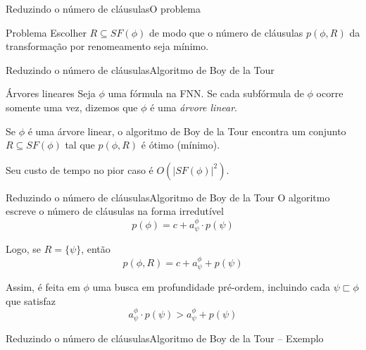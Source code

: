 \begin{frame}{Reduzindo o número de cláusulas}{O problema}
	\begin{block}{Problema}
		Escolher $R \subseteq SF(\phi)$ de modo que o número de cláusulas $p(\phi,R)$ da transformação por renomeamento seja mínimo.
	\end{block}
\end{frame}

\begin{frame}{Reduzindo o número de cláusulas}{Algoritmo de Boy de la Tour}
	\begin{block}{Árvores lineares}
		Seja $\phi$ uma fórmula na FNN. Se cada subfórmula de $\phi$ ocorre somente uma vez, dizemos que $\phi$ é uma \emph{árvore linear}.
	\end{block}
	
	\pause Se $\phi$ é uma árvore linear, o algoritmo de Boy de la Tour encontra um conjunto $R \subseteq SF(\phi)$ tal que $p(\phi,R)$ é ótimo (mínimo).
	
	\vspace{.1cm}
	\pause Seu custo de tempo no pior caso é $O(|SF(\phi)|^2)$.
\end{frame}

\begin{frame}{Reduzindo o número de cláusulas}{Algoritmo de Boy de la Tour}
	O algoritmo escreve o número de cláusulas na forma irredutível $$p(\phi) = c + a_\psi^\phi \cdot p(\psi)$$
	
	\pause Logo, se $R = \{\psi \}$, então $$p(\phi,R) = c + a_\psi^\phi + p(\psi)$$
	
	\pause Assim, é feita em $\phi$ uma busca em profundidade pré-ordem, incluindo cada $\psi \sqsubset \phi$ que satisfaz $$a_\psi^\phi \cdot p(\psi) > a_\psi^\phi + p(\psi)$$
\end{frame}

\begin{frame}{Reduzindo o número de cláusulas}{Algoritmo de Boy de la Tour -- Exemplo}
	
\end{frame}
